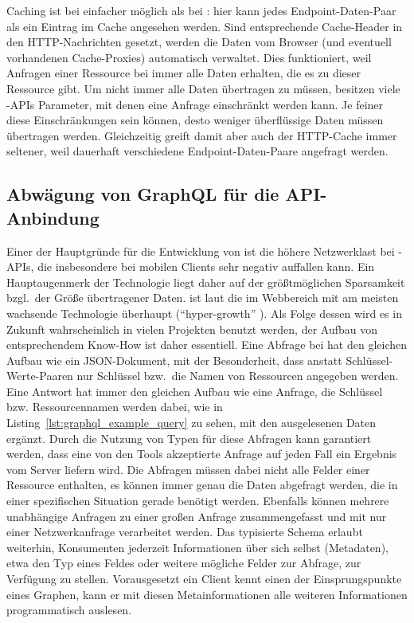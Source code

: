 Caching ist bei  einfacher möglich als bei : hier kann jedes Endpoint-Daten-Paar als ein Eintrag im Cache angesehen werden. Sind entsprechende Cache-Header in den HTTP-Nachrichten gesetzt, werden die Daten vom Browser (und eventuell vorhandenen Cache-Proxies) automatisch verwaltet. Dies funktioniert, weil Anfragen einer Ressource bei  immer alle Daten erhalten, die es zu dieser Ressource gibt. Um nicht immer alle Daten übertragen zu müssen, besitzen viele -APIs Parameter, mit denen eine Anfrage einschränkt werden kann. Je feiner diese Einschränkungen sein können, desto weniger überflüssige Daten müssen übertragen werden. Gleichzeitig greift damit aber auch der HTTP-Cache immer seltener, weil dauerhaft verschiedene Endpoint-Daten-Paare angefragt werden.

\subsection{Abwägung von GraphQL für die API-Anbindung}\label{subsec:graphql}
Einer der Hauptgründe für die Entwicklung von  ist die höhere Netzwerklast bei -APIs, die insbesondere bei mobilen Clients sehr negativ auffallen kann. Ein Hauptaugenmerk der Technologie liegt daher auf der größtmöglichen Sparsamkeit bzgl.\ der Größe übertragener Daten.
 ist laut  die im Webbereich mit am meisten wachsende Technologie überhaupt (\enquote{hyper-growth} \parencite*[vgl.][]{npmjs_2018}). Als Folge dessen wird es in Zukunft wahrscheinlich in vielen Projekten benutzt werden, der Aufbau von entsprechendem Know-How ist daher essentiell.
Eine Abfrage bei  hat den gleichen Aufbau wie ein JSON-Dokument, mit der Besonderheit, dass anstatt Schlüssel-Werte-Paaren nur Schlüssel bzw.\ die Namen von Ressourcen angegeben werden. Eine Antwort hat immer den gleichen Aufbau wie eine Anfrage, die Schlüssel bzw. Ressourcennamen werden dabei, wie in Listing~\ref{lst:graphql_example_query} zu sehen, mit den ausgelesenen Daten ergänzt. Durch die Nutzung von Typen für diese Abfragen kann garantiert werden, dass eine von den Tools akzeptierte Anfrage auf jeden Fall ein Ergebnis vom Server liefern wird. Die Abfragen müssen dabei nicht alle Felder einer Ressource enthalten, es können immer genau die Daten abgefragt werden, die in einer spezifischen Situation gerade benötigt werden. Ebenfalls können mehrere unabhängige Anfragen zu einer großen Anfrage zusammengefasst und mit nur einer Netzwerkanfrage verarbeitet werden.
Das typisierte Schema erlaubt weiterhin, Konsumenten jederzeit Informationen über sich selbst (Metadaten), etwa den Typ eines Feldes oder weitere mögliche Felder zur Abfrage, zur Verfügung zu stellen. Vorausgesetzt ein Client kennt einen der Einsprungspunkte eines Graphen, kann er mit diesen Metainformationen alle weiteren Informationen programmatisch auslesen. 

